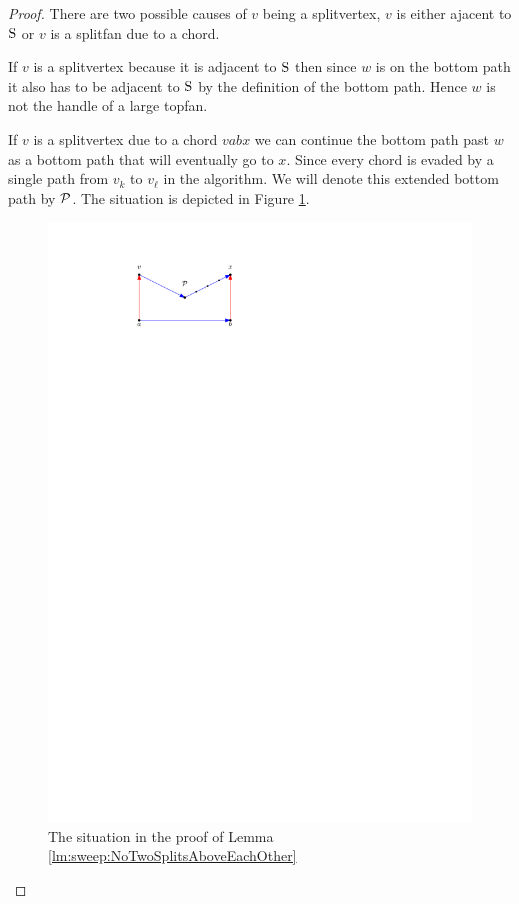     \begin{proof}
      There are two possible causes of $v$ being a splitvertex, $v$ is either ajacent to $\pS$ or $v$ is a splitfan due to a chord.

      If $v$ is a splitvertex because it is adjacent to $\pS$ then since $w$ is on the bottom path it also has to be adjacent to $\pS$ by the definition of the bottom path.
      Hence $w$ is not the handle of a large topfan.

      If $v$ is a splitvertex due to a chord $v a b x$ we can continue the bottom path past $w$ as a bottom path that will eventually go to $x$.
      Since every chord is evaded by a single path from $v_k$ to $v_\ell$ in the algorithm.
      We will denote this extended bottom path by $\P$.
      The situation is depicted in Figure \ref{fig:sweep:botomPathChord}.

      \begin{figure}[b]
        \centering
        \includegraphics[scale=1]{unifiedAlgo/img/sweep/bottompathChord.pdf}
        \caption{The situation in the proof of Lemma \ref{lm:sweep:NoTwoSplitsAboveEachOther}}
        \label{fig:sweep:botomPathChord}
      \end{figure}


\end{proof}
